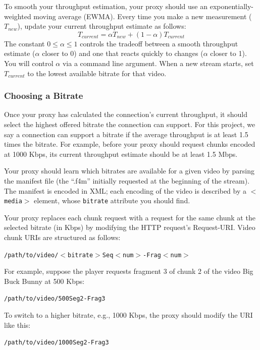 \documentclass{article}
\begin{document}
To smooth your throughput estimation, your proxy should use an
exponentially-weighted moving average (EWMA). Every time you make a new
measurement ($T_{new}$), update your current throughput estimate as follows:
\begin{equation}
	T_{current} = \alpha T_{new}  +  (1 - \alpha)T_{current}
\label{eq:ewma}
\end{equation}
The constant $0 \leq \alpha \leq 1$ controls the tradeoff between a smooth
throughput estimate ($\alpha$ closer to 0) and one that reacts quickly to
changes ($\alpha$ closer to 1). You will control $\alpha$ via a command line
argument. When a new stream starts, set $T_{current}$ to the lowest available
bitrate for that video.



\subsubsection{Choosing a Bitrate}

Once your proxy has calculated the connection's current throughput, it should
select the highest offered bitrate the connection can support. For this
project, we say a connection can support a bitrate if the average throughput is
at least 1.5 times the bitrate. For example, before your proxy should request
chunks encoded at 1000 Kbps, its current throughput estimate should be at least
1.5 Mbps.

Your proxy should learn which bitrates are available for a given video by
parsing the manifest file (the ``.f4m'' initially requested at the beginning of
the stream). The manifest is encoded in XML; each encoding of the video is
described by a \texttt{$<$media$>$} element, whose \texttt{bitrate} attribute
you should find.

Your proxy replaces each chunk request with a request for the same chunk at the
selected bitrate (in Kbps) by modifying the HTTP request's Request-URI. Video
chunk URIs are structured as follows:
\begin{center}
	\texttt{/path/to/video/$<$bitrate$>$Seq$<$num$>$-Frag$<$num$>$}
\end{center}

For example, suppose the player requests fragment 3 of chunk 2 of the video Big
Buck Bunny at 500 Kbps:
\begin{center}
	\texttt{/path/to/video/500Seg2-Frag3}
\end{center}
To switch to a higher bitrate, e.g., 1000 Kbps, the proxy should modify the URI
like this:
\begin{center}
	\texttt{/path/to/video/1000Seg2-Frag3}
\end{center}
\end{document}
